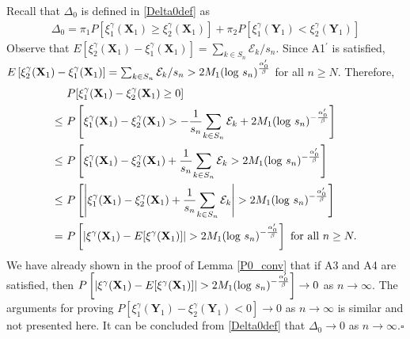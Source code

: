 \documentclass[twoside]{article}
\def\log{\hbox{log}}
\newcommand{\bX}{\mathbf{X}}
\newcommand{\bY}{\mathbf{Y}}
\newcommand{\0}{\mathbf{0}}
\newcommand{\1}{\mathbf{1}}
\newcommand*{\QEDB}{\hfill\ensuremath{\square}}
\numberwithin{equation}{section}
\begin{document}
 Recall that $\Delta_0$ is defined in \eqref{Delta0def} as
\begin{align*}
    \Delta_0 =  \pi_1 P[\xi^{\gamma}_{1}(\bX_1)\geq \xi^{\gamma}_{2}(\bX_1)] + \pi_2 P[\xi^{\gamma}_{1}(\bY_1)<\xi^{\gamma}_{2}(\bY_1)]
\end{align*}
Observe that $E[\xi^{\gamma}_{2}(\bX_1)-\xi^{\gamma}_{1}(\bX_1)] = \sum_{k\in S_n}\mathcal{E}_k/s_n.$ Since A1$^\prime$ is satisfied, $E\left [\xi^{\gamma}_{2}(\bX_1)- \xi^{\gamma}_{1}(\bX_1)\right ]=\sum_{k\in S_n}\mathcal{E}_k/s_n>2M_1(\log \ s_n)^{\frac{\alpha^\prime_0}{\beta}}$ for all $n\geq N.$ Therefore,
\begin{align}\label{mref14}
    &\ P[\xi^{\gamma}_{1}(\bX_1)- \xi^{\gamma}_{2}(\bX_1)\geq 0]\nonumber \\
    \leq &\ P\left [\xi^{\gamma}_{1}(\bX_1)- \xi^{\gamma}_{2}(\bX_1)> -\frac{1}{s_n}{\sum_{k\in S_n}\mathcal{E}_k}+2M_1(\log \ s_n)^{-\frac{\alpha^\prime_0}{\beta}}\right ]\nonumber \\
    \leq &\ P\left [\xi^{\gamma}_{1}(\bX_1)- \xi^{\gamma}_{2}(\bX_1)+\frac{1}{s_n}{\sum_{k\in S_n}\mathcal{E}_k}> 2M_1(\log \ s_n)^{-\frac{\alpha^\prime_0}{\beta}}\right ]\nonumber \\
    \leq &\ P\left [\left |\xi^{\gamma}_{1}(\bX_1)- \xi^{\gamma}_{2}(\bX_1)+\frac{1}{s_n}{\sum_{k\in S_n}\mathcal{E}_k}\right |> 2M_1(\log \ s_n)^{-\frac{\alpha^\prime_0}{\beta}}\right ]\nonumber \\
    =&\ P\left [\left |\xi^{\gamma}(\bX_1)-E[\xi^{\gamma}(\bX_1)]\right |> 2M_1(\log \ s_n)^{-\frac{\alpha^\prime_0}{\beta}}\right ]\text{ for all }n\geq N.
\end{align}
We have already shown in the proof of Lemma \ref{P0_conv}
that if A3 and A4 are satisfied, then $P\left [\left |\xi^{\gamma}(\bX_1)-E[\xi^{\gamma}(\bX_1)]\right |> 2M_1(\log \ s_n)^{-\frac{\alpha^\prime_0}{\beta}}\right ]\to 0$ as $n\to\infty.$  The arguments for proving $P[\xi^{\gamma}_{1}(\bY_1)- \xi^{\gamma}_{2}(\bY_1)< 0]\to 0$ as $n\to\infty$ is similar and not presented here. It can be concluded from \eqref{Delta0def} that $\Delta_0\to 0$ as $n\to\infty.$\hfill\QEDB
\end{document}
